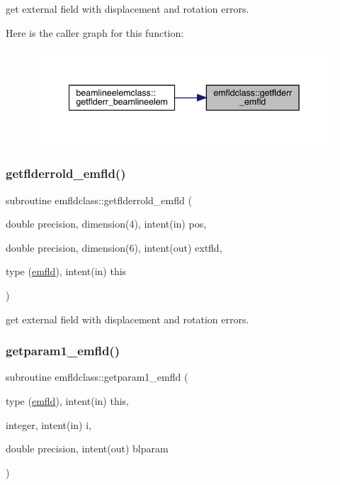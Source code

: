 get external field with displacement and rotation errors. 

Here is the caller graph for this function\+:\nopagebreak
\begin{figure}[H]
\begin{center}
\leavevmode
\includegraphics[width=342pt]{namespaceemfldclass_ad7628b9fdaf5e839e55f71c3f8678c11_icgraph}
\end{center}
\end{figure}
\mbox{\label{namespaceemfldclass_a828e010a02ef4b8d9806f8d4c3053126}} 
\subsubsection{\texorpdfstring{getflderrold\_emfld()}{getflderrold\_emfld()}}
{\footnotesize\ttfamily subroutine emfldclass\+::getflderrold\+\_\+emfld (\begin{DoxyParamCaption}\item[{double precision, dimension(4), intent(in)}]{pos,  }\item[{double precision, dimension(6), intent(out)}]{extfld,  }\item[{type (\mbox{\hyperlink{namespaceemfldclass_structemfldclass_1_1emfld}{emfld}}), intent(in)}]{this }\end{DoxyParamCaption})}



get external field with displacement and rotation errors. 

\mbox{\label{namespaceemfldclass_ae0e0b406ff0837e878753ad73fc1862d}} 
\subsubsection{\texorpdfstring{getparam1\_emfld()}{getparam1\_emfld()}}
{\footnotesize\ttfamily subroutine emfldclass\+::getparam1\+\_\+emfld (\begin{DoxyParamCaption}\item[{type (\mbox{\hyperlink{namespaceemfldclass_structemfldclass_1_1emfld}{emfld}}), intent(in)}]{this,  }\item[{integer, intent(in)}]{i,  }\item[{double precision, intent(out)}]{blparam }\end{DoxyParamCaption})}


